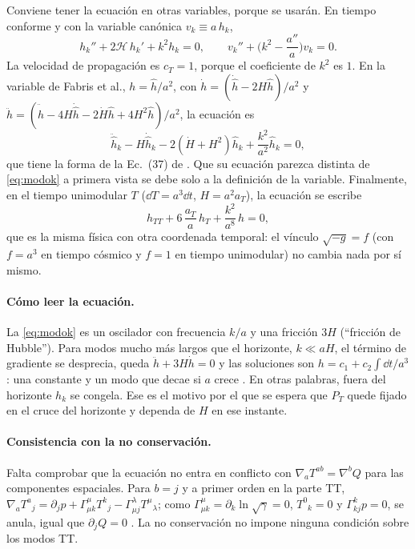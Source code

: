 Conviene tener la ecuación en otras variables, porque se usarán. En tiempo conforme y con la variable canónica $v_k\equiv a\,h_k$,
\begin{equation}
h_k''+2\mathcal H\,h_k'+k^2h_k=0,\qquad v_k''+\Big(k^2-\frac{a''}{a}\Big)v_k=0.
\label{eq:modoconf}
\end{equation}
La velocidad de propagación es $c_T=1$, porque el coeficiente de $k^2$ es $1$. En la variable de Fabris et al., $h=\hat h/a^2$, con $\dot h=(\dot{\hat h}-2H\hat h)/a^2$ y $\ddot h=(\ddot{\hat h}-4H\dot{\hat h}-2\dot H\hat h+4H^2\hat h)/a^2$, la ecuación es
\begin{equation}
\ddot{\hat h}_k-H\dot{\hat h}_k-2(\dot H+H^2)\hat h_k+\frac{k^2}{a^2}\hat h_k=0,
\label{eq:fabris}
\end{equation}
que tiene la forma de la Ec.~(37) de \cite{fabris22} . Que su ecuación parezca distinta de \eqref{eq:modok} a primera vista se debe solo a la definición de la variable. Finalmente, en el tiempo unimodular $T$ ($\dd T=a^3\dd t$, $H=a^2a_T$), la ecuación se escribe
\begin{equation}
h_{TT}+6\,\frac{a_T}{a}\,h_T+\frac{k^2}{a^8}\,h=0,
\label{eq:modoT}
\end{equation}
que es la misma física con otra coordenada temporal: el vínculo $\sqrt{-g}=f$ (con $f=a^3$ en tiempo cósmico y $f=1$ en tiempo unimodular) no cambia nada por sí mismo.

\paragraph{Cómo leer la ecuación.} La \eqref{eq:modok} es un oscilador con frecuencia $k/a$ y una fricción $3H$ (``fricción de Hubble''). Para modos mucho más largos que el horizonte, $k\ll aH$, el término de gradiente se desprecia, queda $\ddot h+3H\dot h=0$ y las soluciones son $h=c_1+c_2\int\dd t/a^3$: una constante y un modo que decae si $a$ crece . En otras palabras, fuera del horizonte $h_k$ se congela. Ese es el motivo por el que se espera que $P_T$ quede fijado en el cruce del horizonte y dependa de $H$ en ese instante.

\paragraph{Consistencia con la no conservación.} Falta comprobar que la ecuación no entra en conflicto con $\nabla_aT^{ab}=\nabla^bQ$ para las componentes espaciales. Para $b=j$ y a primer orden en la parte TT, $\nabla_aT^a{}_j=\partial_jp+\Gamma^\mu_{\mu k}T^k{}_j-\Gamma^\lambda_{\mu j}T^\mu{}_\lambda$; como $\Gamma^\mu_{\mu k}=\partial_k\ln\sqrt\gamma=0$, $T^0{}_k=0$ y $\Gamma^k_{kj}p=0$, se anula, igual que $\partial_jQ=0$ . La no conservación no impone ninguna condición sobre los modos TT.

